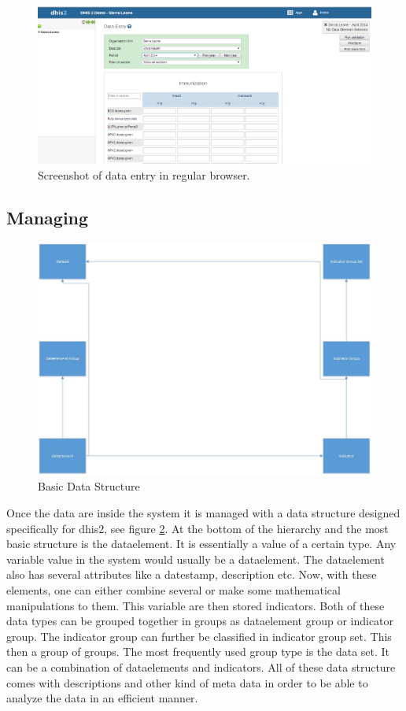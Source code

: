 \begin{figure}
\centering
\includegraphics[width=\columnwidth]{context/img/dhis2DataEntry}
\caption{Screenshot of data entry in regular browser.}
\label{fig:dataentry}
\end{figure}

\subsection{Managing}
\begin{figure}
\centering
\includegraphics[width=\columnwidth]{context/img/dataStructure}
\caption{Basic Data Structure}
\label{fig:structure}
\end{figure}
Once the data are inside the system it is managed with a data structure designed specifically for \gls{dhis2}, see figure \ref{fig:structure}. At the bottom of the hierarchy and the most basic structure is the dataelement. It is essentially a value of a certain type. Any variable value in the system would usually be a dataelement. The dataelement also has several attributes like a datestamp, description etc. Now, with these elements, one can either combine several or make some mathematical manipulations to them. This variable are then stored indicators. Both of these data types can be grouped together in groups as dataelement group or indicator group. The indicator group can further be classified in indicator group set. This then a group of groups. The most frequently used group type is the data set. It can be a combination of dataelements and indicators. 
All of these data structure comes with descriptions and other kind of meta data in order to be able to analyze the data in an efficient manner.


